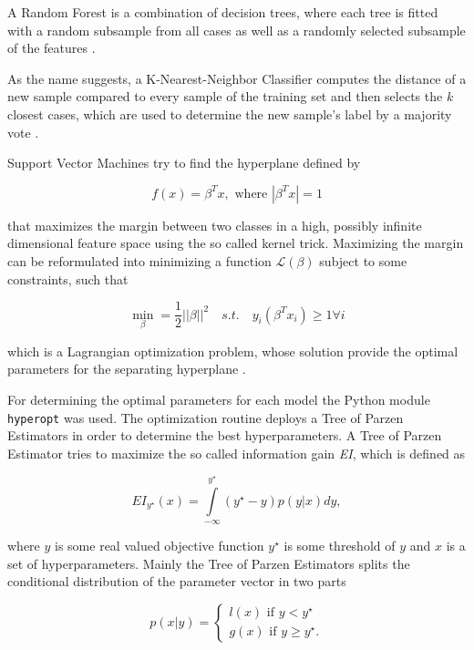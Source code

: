 

A Random Forest is a combination of decision trees, where each tree is fitted with a random subsample from all cases as well as a randomly selected subsample of the features \cite{rf01}.

As the name suggests, a K-Nearest-Neighbor Classifier computes the distance of a new sample compared to every sample of the training set and then selects the $k$ closest cases, which are used to determine the new sample's label by a majority vote \cite{knn}.

Support Vector Machines try to find the hyperplane defined by

\begin{equation*}
f(x) = \beta^T x, \text{ where } |\beta^T x| = 1
\end{equation*}

that maximizes the margin between two classes in a high, possibly infinite dimensional feature space using the so called kernel trick. Maximizing the margin can be reformulated into minimizing a function $\mathcal{L}(\beta)$ subject to some constraints, such that

\begin{equation*}
\min_{\beta} = \frac{1}{2} ||\beta||^2 \quad s.t. \quad y_i (\beta^T x_i) \geq 1 \forall i
\end{equation*}

which is a Lagrangian optimization problem, whose solution provide the optimal parameters for the separating hyperplane \cite{svm}.

For determining the optimal parameters for each model the Python module \texttt{hyperopt} was used. The optimization routine deploys a Tree of Parzen Estimators in order to determine the best hyperparameters. A Tree of Parzen Estimator tries to maximize the so called information gain \textit{EI}, which is defined as

\begin{equation*}
EI_{y^\star}(x) = \int\limits_{-\infty}^{y^\star} (y^\star-y)p(y|x)dy,
\end{equation*}

where $y$ is some real valued objective function $y^\star$ is some threshold of $y$ and $x$ is a set of hyperparameters. Mainly the Tree of Parzen Estimators splits the conditional distribution of the parameter vector in two parts

\begin{equation*}
p(x|y) = \begin{cases}
    l(x) \text{ if } y<y^\star \\
    g(x) \text{ if } y \geq y^\star.
    \end{cases}
\end{equation*}

